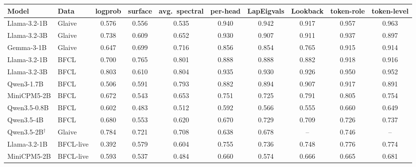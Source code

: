 \begin{tabular}{llcccccccc}
\toprule
Model & Data & logprob & surface & avg.\ spectral & per-head & LapEigvals & Lookback & token-role & token-level \\
\midrule
Llama-3.2-1B & Glaive & 0.576 & 0.556 & 0.535 & 0.940 & 0.942 & 0.917 & 0.957 & 0.963 \\
Llama-3.2-3B & Glaive & 0.738 & 0.609 & 0.652 & 0.930 & 0.907 & 0.911 & 0.937 & 0.897 \\
Gemma-3-1B & Glaive & 0.647 & 0.699 & 0.716 & 0.856 & 0.854 & 0.765 & 0.915 & 0.914 \\
Llama-3.2-1B & BFCL & 0.700 & 0.765 & 0.801 & 0.888 & 0.888 & 0.882 & 0.918 & 0.916 \\
Llama-3.2-3B & BFCL & 0.803 & 0.610 & 0.804 & 0.935 & 0.930 & 0.926 & 0.950 & 0.952 \\
Qwen3-1.7B & BFCL & 0.506 & 0.591 & 0.793 & 0.882 & 0.894 & 0.907 & 0.917 & 0.891 \\
MiniCPM5-2B & BFCL & 0.672 & 0.543 & 0.653 & 0.751 & 0.725 & 0.791 & 0.805 & 0.754 \\
Qwen3.5-0.8B & BFCL & 0.602 & 0.483 & 0.512 & 0.592 & 0.566 & 0.555 & 0.660 & 0.649 \\
Qwen3.5-4B & BFCL & 0.680 & 0.553 & 0.620 & 0.670 & 0.729 & 0.709 & 0.726 & 0.737 \\
Qwen3.5-2B$^\dagger$ & Glaive & 0.784 & 0.721 & 0.708 & 0.638 & 0.678 & -- & 0.746 & -- \\
Llama-3.2-1B & BFCL-live & 0.392 & 0.579 & 0.604 & 0.755 & 0.736 & 0.748 & 0.776 & 0.774 \\
MiniCPM5-2B & BFCL-live & 0.593 & 0.537 & 0.484 & 0.660 & 0.574 & 0.666 & 0.665 & 0.681 \\
\bottomrule
\end{tabular}
